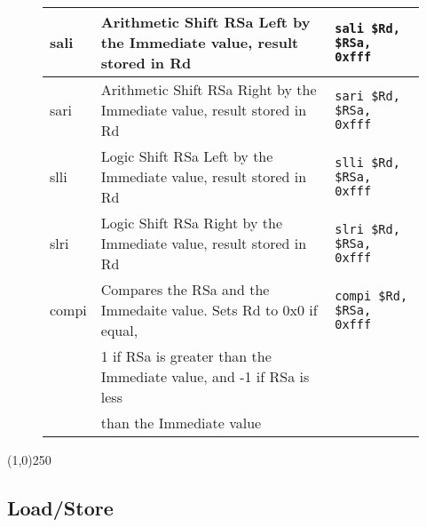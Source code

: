 \documentclass[letterpaper, 11pt]{article}
\begin{document}
\begin{figure}[!h]
\begin{center}
\begin{tabular}{|l|l|l|}
			sali				& Arithmetic Shift RSa Left by the Immediate value, result stored in Rd	& \texttt{sali \$Rd, \$RSa, 0xfff}	\\ \hline	
			sari				& Arithmetic Shift RSa Right by the Immediate value, result stored in Rd& \texttt{sari \$Rd, \$RSa, 0xfff}	\\ \hline	
			slli				& Logic Shift RSa Left by the Immediate value, result stored in Rd		& \texttt{slli \$Rd, \$RSa, 0xfff}	\\ \hline	
			slri				& Logic Shift RSa Right by the Immediate value, result stored in Rd		& \texttt{slri \$Rd, \$RSa, 0xfff}	\\ \hline	
			compi				& Compares the RSa and the Immedaite value. Sets Rd to 0x0 if equal,	& \texttt{compi \$Rd, \$RSa, 0xfff}	\\
			\hfill				& 1 if RSa is greater than the Immediate value, and -1 if RSa is less	& \hfill							\\
			\hfill				& than the Immediate value												& \hfill 							\\ \hline
		\end{tabular} 
	\end{center}
	
\end{figure}


\begin{center}
	\line(1,0){250}
\end{center}
\clearpage
\subsection{Load/Store}
\end{document}
